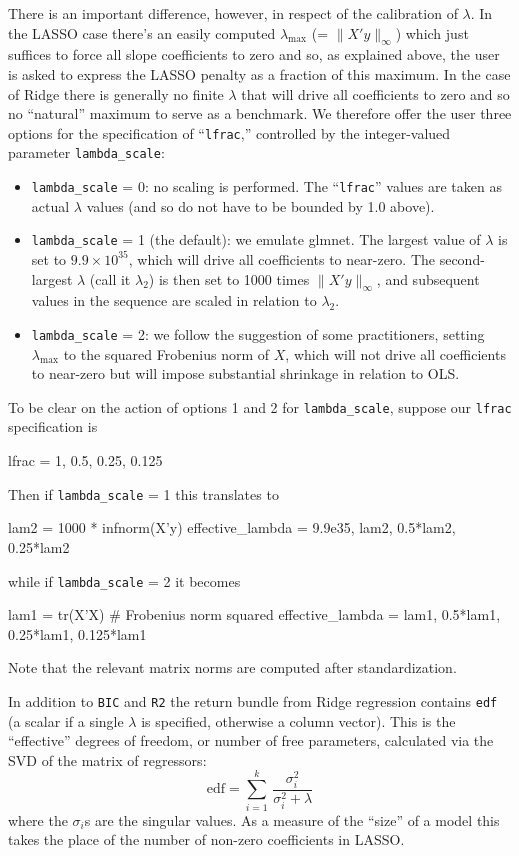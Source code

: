 \documentclass{article}
\begin{document}
There is an important difference, however, in respect of the
calibration of $\lambda$. In the LASSO case there's an easily computed
$\lambda_{\max}$ (= $\|X'y\|_{\infty}$) which just suffices to force
all slope coefficients to zero and so, as explained above, the user is
asked to express the LASSO penalty as a fraction of this maximum. In
the case of Ridge there is generally no finite $\lambda$ that will
drive all coefficients to zero and so no ``natural'' maximum to serve
as a benchmark. We therefore offer the user three options for the
specification of ``\texttt{lfrac},'' controlled by the integer-valued
parameter \texttt{lambda\_scale}:
\begin{itemize}
\item \texttt{lambda\_scale} = 0: no scaling is performed. The
  ``\texttt{lfrac}'' values are taken as actual $\lambda$ values (and
  so do not have to be bounded by 1.0 above).
\item \texttt{lambda\_scale} = 1 (the default): we emulate
  \textsf{glmnet}. The largest value of $\lambda$ is set to
  $9.9 \times 10^{35}$, which will drive all coefficients to
  near-zero. The second-largest $\lambda$ (call it $\lambda_2$) is
  then set to 1000 times $\|X'y\|_{\infty}$, and subsequent values in
  the sequence are scaled in relation to $\lambda_2$.
\item \texttt{lambda\_scale} = 2: we follow the suggestion of some
  practitioners, setting $\lambda_{\max}$ to the squared Frobenius
  norm of $X$, which will not drive all coefficients to near-zero but
  will impose substantial shrinkage in relation to OLS.
\end{itemize}

To be clear on the action of options 1 and 2 for
\texttt{lambda\_scale}, suppose our \texttt{lfrac} specification is
\begin{code}
lfrac = {1, 0.5, 0.25, 0.125}
\end{code}
Then if \texttt{lambda\_scale} = 1 this translates to
\begin{code}
lam2 = 1000 * infnorm(X'y)
effective_lambda = {9.9e35, lam2, 0.5*lam2, 0.25*lam2}
\end{code}
while if \texttt{lambda\_scale} = 2 it becomes
\begin{code}
lam1 = tr(X'X) # Frobenius norm squared
effective_lambda = {lam1, 0.5*lam1, 0.25*lam1, 0.125*lam1}
\end{code}
Note that the relevant matrix norms are computed after
standardization.

In addition to \texttt{BIC} and \texttt{R2} the return bundle from
Ridge regression contains \texttt{edf} (a scalar if a single $\lambda$
is specified, otherwise a column vector). This is the ``effective''
degrees of freedom, or number of free parameters, calculated via
the SVD of the matrix of regressors:
\begin{equation}
  \label{eq:edf}
\mbox{edf} = \sum_{i=1}^k\, \frac{\sigma_i^2}{\sigma_i^2 + \lambda}
\end{equation}
where the $\sigma_i$s are the singular values. As a measure of the
``size'' of a model this takes the place of the number of non-zero
coefficients in LASSO.
\end{document}
